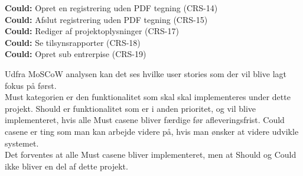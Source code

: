 \textbf{Could:} Opret en registrering uden PDF tegning (CRS-14) \\
\textbf{Could:} Afslut registrering uden PDF tegning (CRS-15) \\
\textbf{Could:} Rediger af projektoplysninger (CRS-17) \\
\textbf{Could:} Se tilsynsrapporter (CRS-18) \\
\textbf{Could:} Opret sub entrerpise (CRS-19)

Udfra MoSCoW analysen kan det ses hvilke user stories som der vil blive lagt fokus på først. \\
Must kategorien er den funktionalitet som skal skal implementeres under dette projekt. Should er funktionalitet som er i anden prioritet, og vil blive implementeret, hvis alle Must casene bliver færdige før afleveringsfrist. Could casene er ting som man kan arbejde videre på, hvis man ønsker at videre udvikle systemet. \\
Det forventes at alle Must casene bliver implementeret, men at Should og Could ikke bliver en del af dette projekt.